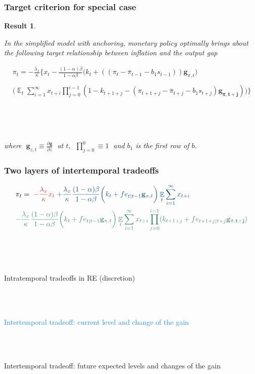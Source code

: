 \documentclass[11pt]{beamer}
\DeclareMathOperator{\E}{\mathbb{E}}
\newtheorem{result}{Result}
\begin{document}
\begin{frame}
	\frametitle{Target criterion for special case}
	\label{anchTC}
	
	\begin{result} 

\

In the simplified model with anchoring, monetary policy optimally brings about the following target relationship between inflation and the output gap
	
\begin{align*}
\pi_t  = -\frac{\lambda_x}{\kappa}\bigg\{x_t - \frac{(1-\alpha)\beta}{1-\alpha\beta} \bigg(k_t+((\pi_t - \bar{\pi}_{t-1}-b_1 s_{t-1}))\mathbf{g}_{\pi,t}\bigg) \\
\\
\bigg(\E_t\sum_{i=1}^{\infty}x_{t+i}\prod_{j=0}^{i-1}(1-k_{t+1+j} - (\pi_{t+1+j} - \bar{\pi}_{t+j}-b_1 s_{t+j})\mathbf{g_{\bar{\pi}, t+j}}) \bigg)
\bigg\}  \label{target}
\end{align*}

\

\

where $\; \mathbf{g}_{z,t} \equiv \frac{\partial \mathbf{g}}{\partial z}\;$ at $t$, $\; \prod_{j=0}^{0} \equiv 1 \; $ and $b_1$ is the first row of $b$.
	\end{result}
\vfill 

\hfill \hyperlink{generalTC}{}

\end{frame}

\begin{frame}
	\frametitle{Two layers of intertemporal tradeoffs}
\small{
\begin{align*}
& \pi_t  =  \; \textcolor{brownreddark}{-\frac{\lambda_x}{\kappa} x_t} \textcolor{dodgerblue}{ \; + \frac{\lambda_x}{\kappa} \frac{(1-\alpha)\beta}{1-\alpha\beta} \bigg(k_t+ fe_{t|t-1}\mathbf{g}_{\pi,t} \bigg)\E_t\sum_{i=1}^{\infty}x_{t+i}}  \\
& \textcolor{aquamarinegreen}{- \frac{\lambda_x}{\kappa} \frac{(1-\alpha)\beta}{1-\alpha\beta} \bigg(k_t+ fe_{t|t-1}\mathbf{g}_{\pi,t} \bigg)\E_t\sum_{i=1}^{\infty}x_{t+i}\prod_{j=0}^{i-1}(k_{t+1+j}+ fe_{t+1+j|t+j}\mathbf{g_{\bar{\pi},t+j}} )}
\end{align*}

\

\

\textcolor{brownreddark}{Intratemporal tradeoffs in RE (discretion)} \\

\

\

\textcolor{dodgerblue}{Intertemporal tradeoff: current level and change of the gain } \\

\

\

\textcolor{aquamarinegreen}{Intertemporal tradeoff: future expected levels and changes of the gain}

}
\end{frame}
\end{document}
